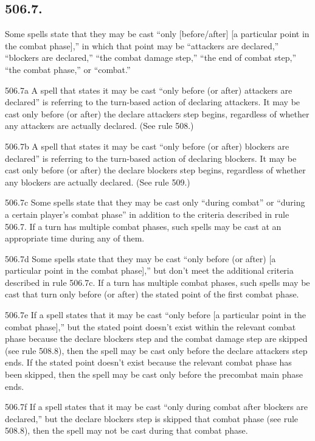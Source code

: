 \subsection*{506.7.}
Some spells state that they may be cast “only [before/after] [a particular point in the combat phase],” in which that point may be “attackers are declared,” “blockers are declared,” “the combat damage step,” “the end of combat step,” “the combat phase,” or “combat.”

506.7a A spell that states it may be cast “only before (or after) attackers are declared” is referring to the turn-based action of declaring attackers. It may be cast only before (or after) the declare attackers step begins, regardless of whether any attackers are actually declared. (See rule 508.)

506.7b A spell that states it may be cast “only before (or after) blockers are declared” is referring to the turn-based action of declaring blockers. It may be cast only before (or after) the declare blockers step begins, regardless of whether any blockers are actually declared. (See rule 509.)

506.7c Some spells state that they may be cast only “during combat” or “during a certain player’s combat phase” in addition to the criteria described in rule 506.7. If a turn has multiple combat phases, such spells may be cast at an appropriate time during any of them.

506.7d Some spells state that they may be cast “only before (or after) [a particular point in the combat phase],” but don’t meet the additional criteria described in rule 506.7c. If a turn has multiple combat phases, such spells may be cast that turn only before (or after) the stated point of the first combat phase.

506.7e If a spell states that it may be cast “only before [a particular point in the combat phase],” but the stated point doesn’t exist within the relevant combat phase because the declare blockers step and the combat damage step are skipped (see rule 508.8), then the spell may be cast only before the declare attackers step ends. If the stated point doesn’t exist because the relevant combat phase has been skipped, then the spell may be cast only before the precombat main phase ends.

506.7f If a spell states that it may be cast “only during combat after blockers are declared,” but the declare blockers step is skipped that combat phase (see rule 508.8), then the spell may not be cast during that combat phase.

